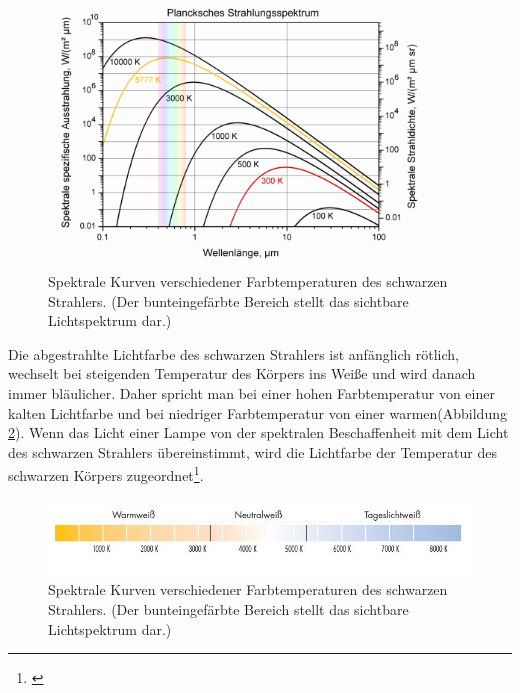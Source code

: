 \begin{figure}[H]     %
\centering
\includegraphics[width=0.9\textwidth]{bilder/cct2} 
\caption {Spektrale Kurven verschiedener Farbtemperaturen des schwarzen Strahlers. (Der bunteingefärbte Bereich stellt das sichtbare Lichtspektrum dar.)\protect\footnotemark}\label{b_cct2}
\end{figure}

\noindent Die abgestrahlte Lichtfarbe des schwarzen Strahlers ist anfänglich rötlich, wechselt bei steigenden Temperatur des Körpers ins Weiße und wird danach immer bläulicher. Daher spricht man bei einer hohen Farbtemperatur von einer kalten Lichtfarbe und bei niedriger Farbtemperatur von einer warmen(Abbildung \ref{b_cct1}). Wenn das Licht einer Lampe von der spektralen Beschaffenheit mit dem Licht des schwarzen Strahlers übereinstimmt, wird die Lichtfarbe der Temperatur des schwarzen Körpers zugeordnet\footnote{\cite[89]{mueller}}.

\begin{figure}[H]     %
\centering
\includegraphics[width=1.0\textwidth]{bilder/cct1} 
\caption {Spektrale Kurven verschiedener Farbtemperaturen des schwarzen Strahlers. (Der bunteingefärbte Bereich stellt das sichtbare Lichtspektrum dar.)\protect\footnotemark}\label{b_cct1}
\end{figure}




